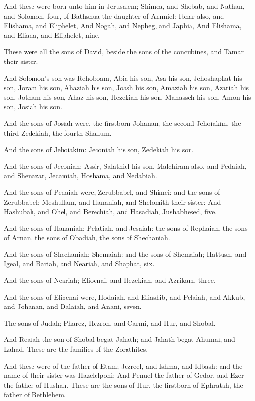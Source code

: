 \Verse And these were born unto him in Jerusalem; Shimea, and Shobab, and Nathan, and Solomon, four, of Bathshua the daughter of Ammiel: \Verse Ibhar also, and Elishama, and Eliphelet, \Verse And Nogah, and Nepheg, and Japhia, \Verse And Elishama, and Eliada, and Eliphelet, nine.

\Verse These were all the sons of David, beside the sons of the concubines, and Tamar their sister.

\Verse And Solomon's son was Rehoboam, Abia his son, Asa his son, Jehoshaphat his son, \Verse Joram his son, Ahaziah his son, Joash his son, \Verse Amaziah his son, Azariah his son, Jotham his son, \Verse Ahaz his son, Hezekiah his son, Manasseh his son, \Verse Amon his son, Josiah his son.

\Verse And the sons of Josiah were, the firstborn Johanan, the second Jehoiakim, the third Zedekiah, the fourth Shallum.

\Verse And the sons of Jehoiakim: Jeconiah his son, Zedekiah his son.

\Verse And the sons of Jeconiah; Assir, Salathiel his son, \Verse Malchiram also, and Pedaiah, and Shenazar, Jecamiah, Hoshama, and Nedabiah.

\Verse And the sons of Pedaiah were, Zerubbabel, and Shimei: and the sons of Zerubbabel; Meshullam, and Hananiah, and Shelomith their sister: \Verse And Hashubah, and Ohel, and Berechiah, and Hasadiah, Jushabhesed, five.

\Verse And the sons of Hananiah; Pelatiah, and Jesaiah: the sons of Rephaiah, the sons of Arnan, the sons of Obadiah, the sons of Shechaniah.

\Verse And the sons of Shechaniah; Shemaiah: and the sons of Shemaiah; Hattush, and Igeal, and Bariah, and Neariah, and Shaphat, six.

\Verse And the sons of Neariah; Elioenai, and Hezekiah, and Azrikam, three.

\Verse And the sons of Elioenai were, Hodaiah, and Eliashib, and Pelaiah, and Akkub, and Johanan, and Dalaiah, and Anani, seven.


\Chapter
\Verse The sons of Judah; Pharez, Hezron, and Carmi, and Hur, and Shobal.

\Verse And Reaiah the son of Shobal begat Jahath; and Jahath begat Ahumai, and Lahad. These are the families of the Zorathites.

\Verse And these were of the father of Etam; Jezreel, and Ishma, and Idbash: and the name of their sister was Hazelelponi: \Verse And Penuel the father of Gedor, and Ezer the father of Hushah. These are the sons of Hur, the firstborn of Ephratah, the father of Bethlehem.

